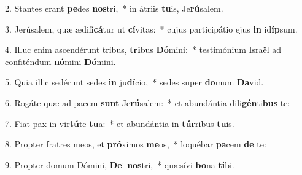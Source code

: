 2. Stantes erant \textbf{pe}des \textbf{nos}tri,~*  in átriis \textbf{tu}is, Je\textbf{rú}salem.\

3. Jerúsalem, quæ ædifi\textbf{cá}tur ut \textbf{cí}vitas:~*  cujus participátio ejus \textbf{in} id\textbf{íp}sum.\

4. Illuc enim ascendérunt tribus, \textbf{tri}bus \textbf{Dó}mini:~*  testimónium Israël ad confiténdum \textbf{nó}mini \textbf{Dó}mini.\

5. Quia illic sedérunt sedes \textbf{in} ju\textbf{dí}cio,~*  sedes super \textbf{do}mum \textbf{Da}vid.\

6. Rogáte quæ ad pacem \textbf{sunt} Je\textbf{rú}salem:~*  et abundántia dili\textbf{gén}ti\textbf{bus} te:\

7. Fiat pax in vir\textbf{tú}te \textbf{tu}a:~*  et abundántia in \textbf{túr}ribus \textbf{tu}is.\

8. Propter fratres meos, et \textbf{pró}ximos \textbf{me}os,~*  loquébar \textbf{pa}cem \textbf{de} te:\

9. Propter domum Dómini, \textbf{De}i \textbf{nos}tri,~*  quæsívi \textbf{bo}na \textbf{ti}bi.\

